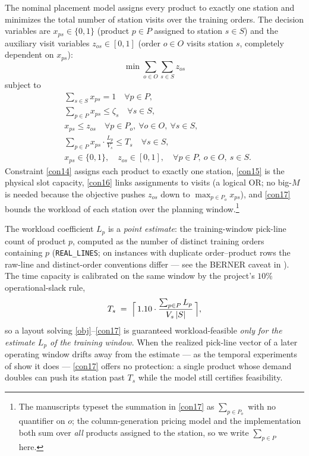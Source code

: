 The nominal placement model assigns every product to exactly one station and
minimizes the total number of station visits over the training orders. The
decision variables are $x_{ps} \in \{0,1\}$ (product $p \in P$ assigned to
station $s \in S$) and the auxiliary visit variables $z_{os} \in [0,1]$ (order
$o \in O$ visits station $s$, completely dependent on $x_{ps}$):
\begin{equation}
\min \sum_{o \in O} \sum_{s \in S} z_{os}
\label{obj}
\end{equation}
subject to
\begin{align}
&\sum_{s \in S} x_{ps} = 1 \quad \forall p \in P, \label{con14}\\
&\sum_{p \in P} x_{ps} \leq \zeta_s \quad \forall s \in S, \label{con15}\\
&x_{ps} \leq z_{os} \quad \forall p \in P_o,\ \forall o \in O,\ \forall s \in S, \label{con16}\\
&\sum_{p \in P} x_{ps} \cdot \frac{L_p}{V_s} \leq T_s \quad \forall s \in S, \label{con17}\\
&x_{ps} \in \{0, 1\}, \quad z_{os} \in [0,1], \quad \forall p \in P,\ o \in O,\ s \in S. \nonumber
\end{align}
Constraint \eqref{con14} assigns each product to exactly one station,
\eqref{con15} is the physical slot capacity, \eqref{con16} links assignments to
visits (a logical OR; no big-$M$ is needed because the objective pushes
$z_{os}$ down to $\max_{p \in P_o} x_{ps}$), and \eqref{con17} bounds the
workload of each station over the planning window.\footnote{The manuscripts typeset the summation in
\eqref{con17} as $\sum_{p \in P_o}$ with no quantifier on $o$; the column-generation
pricing model and the implementation both sum over \emph{all} products assigned
to the station, so we write $\sum_{p \in P}$ here.}

The workload coefficient $L_p$ is a \emph{point estimate}: the training-window
pick-line count of product $p$, computed as the number of distinct training
orders containing $p$ (\texttt{REAL\_LINES}; on instances with duplicate
order--product rows the raw-line and distinct-order conventions differ ---
see the BERNER caveat in ). The time capacity is
calibrated on the same window by the
project's $10\%$ operational-slack rule,
\begin{equation}
T_s \;=\; \Bigl\lceil\, 1.10 \cdot \frac{\sum_{p \in P} L_p}{V_s\,|S|} \,\Bigr\rceil,
\label{eq:bs-slack}
\end{equation}
so a layout solving \eqref{obj}--\eqref{con17} is guaranteed workload-feasible
\emph{only for the estimate $L_p$ of the training window}. When the realized
pick-line vector of a later operating window drifts away from the estimate ---
as the temporal experiments of  show it does ---
\eqref{con17} offers no protection: a single product whose demand doubles can
push its station past $T_s$ while the model still certifies feasibility.

